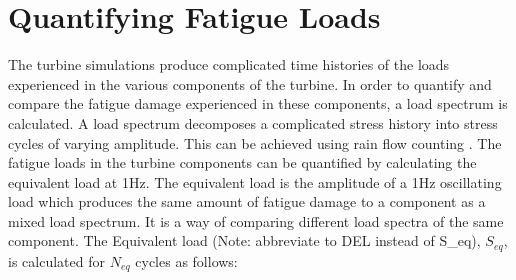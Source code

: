

\section{Quantifying Fatigue Loads}
The turbine simulations produce complicated time histories of the loads experienced in the various components of the turbine. In order to quantify and compare the fatigue damage experienced in these components, a load spectrum is calculated. A load spectrum decomposes a complicated stress history into stress cycles of varying amplitude. This can be achieved using rain flow counting \cite{matsuishi1968fatigue}. The fatigue loads in the turbine components can be quantified by calculating the equivalent load at 1Hz. The equivalent load is the amplitude of a 1Hz oscillating load which produces the same amount of fatigue damage to a component as a mixed load spectrum. It is a way of comparing different load spectra of the same component. The Equivalent load (Note: abbreviate to DEL instead of S_eq), $S_{eq}$, is calculated for $N_{eq}$ cycles as follows:

